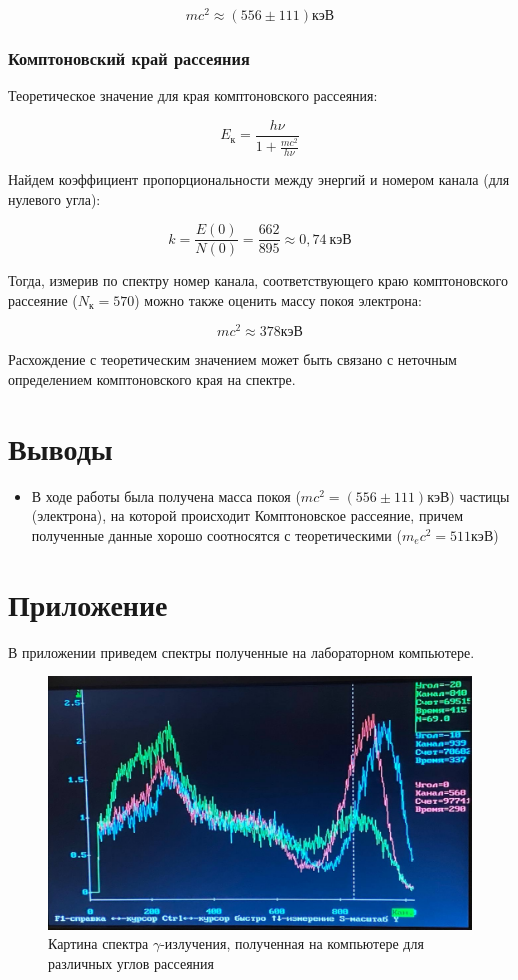 \documentclass[a4paper,12pt]{article}
\begin{document}
$$
	mc^2 \approx (556 \pm  111) кэВ
$$ 

\pagebreak

\subsubsection*{Комптоновский край рассеяния}

Теоретическое значение для края комптоновского рассеяния:

$$
	E_к = \frac{h\nu}{1 + \frac{mc^2}{h\nu}}
$$

Найдем коэффициент пропорциональности между энергий и номером канала (для нулевого угла):

$$
	k = \frac{E(0)}{N(0)} = \frac{662}{895} \approx 0,74 \  кэВ
$$

Тогда, измерив по спектру номер канала, соответствующего краю комптоновского рассеяние ($N_к = 570$) можно также оценить массу покоя электрона:

$$
	mc^2 \approx 378 кэВ
$$

Расхождение с теоретическим значением может быть связано с неточным определением комптоновского края на спектре.

\section*{Выводы}

\begin{itemize}
	\item В ходе работы была получена масса покоя ($mc^2 = (556 \pm 111) кэВ)$ частицы (электрона), на которой происходит Комптоновское рассеяние, причем полученные данные хорошо соотносятся с теоретическими ($m_ec^2 = 511 кэВ$)
\end{itemize}

\newpage

\section*{Приложение}

В приложении приведем спектры полученные на лабораторном компьютере.

\begin{figure}[h!]
	\centering
	\includegraphics[width=0.8\linewidth]{spectre_1}
	\caption{Картина спектра $\gamma$-излучения, полученная на компьютере для различных углов рассеяния}
\end{figure}
\end{document}
